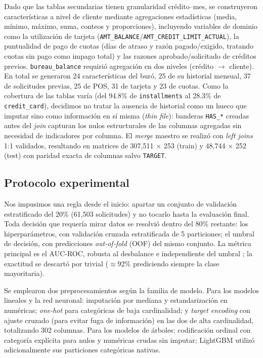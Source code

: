 \documentclass[journal]{IEEEtran}
\begin{document}
Dado que las tablas secundarias tienen granularidad crédito--mes, se construyeron características a nivel de cliente mediante agregaciones estadísticas (media, mínimo, máximo, suma, conteos y proporciones), incluyendo variables de dominio como la utilización de tarjeta (\texttt{AMT\_BALANCE}/\texttt{AMT\_CREDIT\_LIMIT\_ACTUAL}), la puntualidad de pago de cuotas (días de atraso y razón pagado/exigido, tratando cuotas sin pago como impago total) y las razones aprobado/solicitado de créditos previos. \texttt{bureau\_balance} requirió agregación en dos niveles (crédito $\rightarrow$ cliente). En total se generaron 24 características del buró, 25 de su historial mensual, 37 de solicitudes previas, 25 de POS, 31 de tarjeta y 23 de cuotas. Como la cobertura de las tablas varía (del 94.8\% de \texttt{installments} al 28.3\% de \texttt{credit\_card}), decidimos no tratar la ausencia de historial como un hueco que imputar sino como información en sí misma (\textit{thin file}): banderas \texttt{HAS\_*} creadas antes del \textit{join} capturan los nulos estructurales de las columnas agregadas sin necesidad de indicadores por columna. El \textit{merge} maestro se realizó con \textit{left joins} 1:1 validados, resultando en matrices de 307{,}511 $\times$ 253 (train) y 48{,}744 $\times$ 252 (test) con paridad exacta de columnas salvo \texttt{TARGET}.

\subsection{Protocolo experimental}

Nos impusimos una regla desde el inicio: apartar un conjunto de validación estratificado del 20\% (61{,}503 solicitudes) y no tocarlo hasta la evaluación final. Toda decisión que requería mirar datos se resolvió dentro del 80\% restante: los hiperparámetros, con validación cruzada estratificada de 5 particiones; el umbral de decisión, con predicciones \textit{out-of-fold} (OOF) del mismo conjunto. La métrica principal es el AUC-ROC, robusta al desbalance e independiente del umbral \cite{brown2012,he2009}; la exactitud se descartó por trivial ($\approx$92\% prediciendo siempre la clase mayoritaria).

Se emplearon dos preprocesamientos según la familia de modelo. Para los modelos lineales y la red neuronal: imputación por mediana y estandarización en numéricas; \textit{one-hot} para categóricas de baja cardinalidad; y \textit{target encoding} con ajuste cruzado (para evitar fuga de información) en las dos de alta cardinalidad, totalizando 302 columnas. Para los modelos de árboles: codificación ordinal con categoría explícita para nulos y numéricas crudas sin imputar; LightGBM utilizó adicionalmente sus particiones categóricas nativas.
\end{document}
